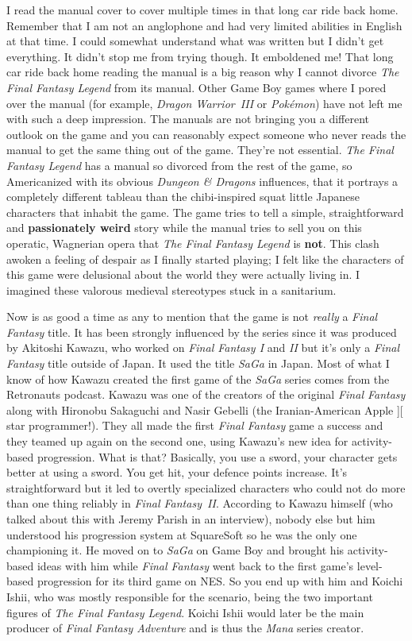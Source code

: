 \documentclass{book}
\begin{document}
I read the manual cover to cover multiple times in that long car ride back home. Remember that I am not an anglophone and had very limited abilities in English at that time. I could somewhat understand what was written but I didn’t get everything. It didn’t stop me from trying though. It emboldened me! That long car ride back home reading the manual is a big reason why I cannot divorce \emph{The Final Fantasy Legend} from its manual. Other Game Boy games where I pored over the manual (for example, \emph{Dragon Warrior~III} or \emph{Pokémon}) have not left me with such a deep impression. The manuals are not bringing you a different outlook on the game and you can reasonably expect someone who never reads the manual to get the same thing out of the game. They’re not essential. \emph{The Final Fantasy Legend} has a manual so divorced from the rest of the game, so Americanized with its obvious \emph{Dungeon \& Dragons} influences, that it portrays a completely different tableau than the chibi-inspired squat little Japanese characters that inhabit the game. The game tries to tell a simple, straightforward and \textbf{passionately weird} story while the manual tries to sell you on this operatic, Wagnerian opera that \emph{The Final Fantasy Legend} is \textbf{not}. This clash awoken a feeling of despair as I finally started playing; I felt like the characters of this game were delusional about the world they were actually living in. I imagined these valorous medieval stereotypes stuck in a sanitarium.



Now is as good a time as any to mention that the game is not \emph{really} a \emph{Final Fantasy} title. It has been strongly influenced by the series since it was produced by Akitoshi Kawazu, who worked on \emph{Final Fantasy I} and \emph{II} but it’s only a \emph{Final Fantasy} title outside of Japan. It used the title \emph{SaGa} in Japan. Most of what I know of how Kawazu created the first game of the \emph{SaGa} series comes from the Retronauts podcast. Kawazu was one of the creators of the original \emph{Final Fantasy} along with Hironobu Sakaguchi and Nasir Gebelli (the Iranian-American Apple ][ star programmer!). They all made the first \emph{Final Fantasy} game a success and they teamed up again on the second one, using Kawazu’s new idea for activity-based progression. What is that? Basically, you use a sword, your character gets better at using a sword. You get hit, your defence points increase. It’s straightforward but it led to overtly specialized characters who could not do more than one thing reliably in \emph{Final Fantasy~II}. According to Kawazu himself (who talked about this with Jeremy Parish in an interview), nobody else but him understood his progression system at SquareSoft so he was the only one championing it. He moved on to \emph{SaGa} on Game Boy and brought his activity-based ideas with him while \emph{Final Fantasy} went back to the first game’s level-based progression for its third game on NES. So you end up with him and Koichi Ishii, who was mostly responsible for the scenario, being the two important figures of \emph{The Final Fantasy Legend}. Koichi Ishii would later be the main producer of \emph{Final Fantasy Adventure} and is thus the \emph{Mana} series creator.
\end{document}
